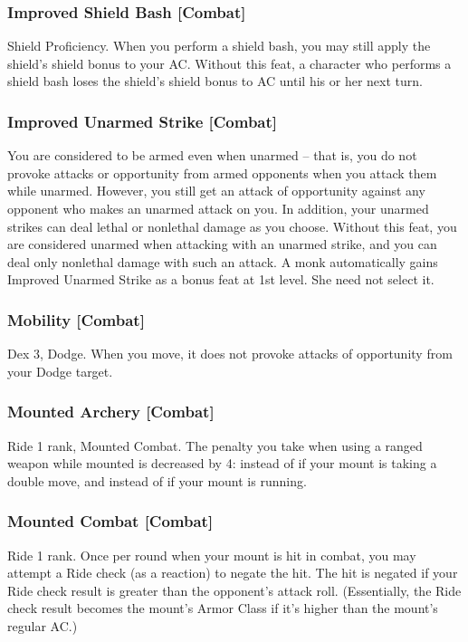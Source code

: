\subsubsection{Improved Shield Bash [Combat]}
 Shield Proficiency.
 When you perform a shield bash, you may still apply the shield's shield bonus to your AC.
 Without this feat, a character who performs a shield bash loses the shield's shield bonus to AC until his or her next turn.%

\subsubsection{Improved Unarmed Strike [Combat]}
 You are considered to be armed even when unarmed -- that is, you do not provoke attacks or opportunity from armed opponents when you attack them while unarmed. However, you still get an attack of opportunity against any opponent who makes an unarmed attack on you.
In addition, your unarmed strikes can deal lethal or nonlethal damage as you choose.
 Without this feat, you are considered unarmed when attacking with an unarmed strike, and you can deal only nonlethal damage with such an attack.
 A monk automatically gains Improved Unarmed Strike as a bonus feat at 1st level. She need not select it.

\subsubsection{Mobility [Combat]}
 Dex 3, Dodge.
 When you move, it does not provoke attacks of opportunity from your Dodge target.

\subsubsection{Mounted Archery [Combat]}
 Ride 1 rank, Mounted Combat.
 The penalty you take when using a ranged weapon while mounted is decreased by 4:  instead of  if your mount is taking a double move, and  instead of  if your mount is running.

\subsubsection{Mounted Combat [Combat]}
 Ride 1 rank.
 Once per round when your mount is hit in combat, you may attempt a Ride check (as a reaction) to negate the hit. The hit is negated if your Ride check result is greater than the opponent's attack roll. (Essentially, the Ride check result becomes the mount's Armor Class if it's higher than the mount's regular AC.)%


